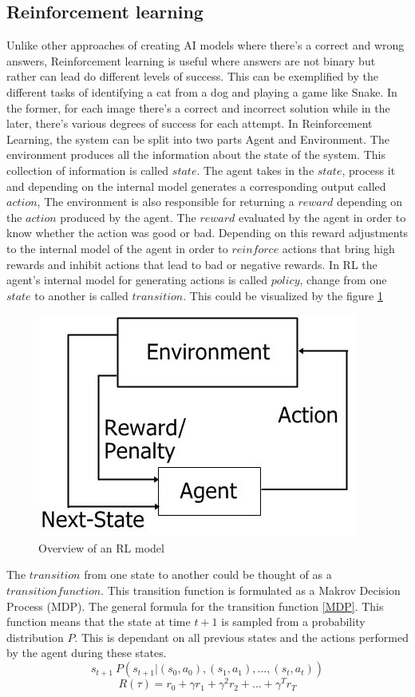 \documentclass[conference]{IEEEtran}
\begin{document}
\subsection{Reinforcement learning}
Unlike other approaches of creating AI models where there's a correct and wrong answers, Reinforcement learning is useful where answers are not binary but rather can lead do different levels of success. This can be exemplified by the different tasks of identifying a cat from a dog and playing a game like Snake. In the former, for each image there's a correct and incorrect solution while in the later, there's various degrees of success for each attempt. In Reinforcement Learning, the system can be split into two parts Agent and Environment. The environment produces all the information about the state of the system. This collection of information is called $state$. The agent takes in the $state$, process it and depending on the internal model generates a corresponding output called $action$, The environment is also responsible for returning a $reward$ depending on the $action$ produced by the agent. The $reward$ evaluated by the agent in order to know whether the action was good or bad. Depending on this reward adjustments to the internal model of the agent in order to $reinforce$ actions that bring high rewards and inhibit actions that lead to bad or negative rewards. In RL the agent's internal model for generating actions is called $policy$, change from one $state$ to another is called $transition$. This could be visualized by the figure \ref{fig:RL}
\begin{figure}
	\centering
	\includegraphics[width=0.5\linewidth]{Reinforcement-Learning-block-diagram.png}
	\caption{Overview of an RL model\cite{inproceedings}}
	\label{fig:RL}
\end{figure}
The $transition$ from one state to another could be thought of as a $transition function$. This transition function is formulated as a Makrov Decision Process (MDP)\cite{graesser2019foundations}. The general formula for the transition function \ref{MDP}. This function means that the state at time $t+1$ is sampled from a probability distribution $P$. This is dependant on all previous states and the actions performed by the agent during these states.
\begin{equation}
	s_{t+1}~P(s_{t+1}|(s_0,a_0),(s_1,a_1),...,(s_t,a_t))
	\label{MDP}
\end{equation}
\begin{equation}
	R(\tau)= r_0+\gamma r_1+\gamma^2r_2+...+\gamma^Tr_T
	\label{reward}
\end{equation}
\end{document}
